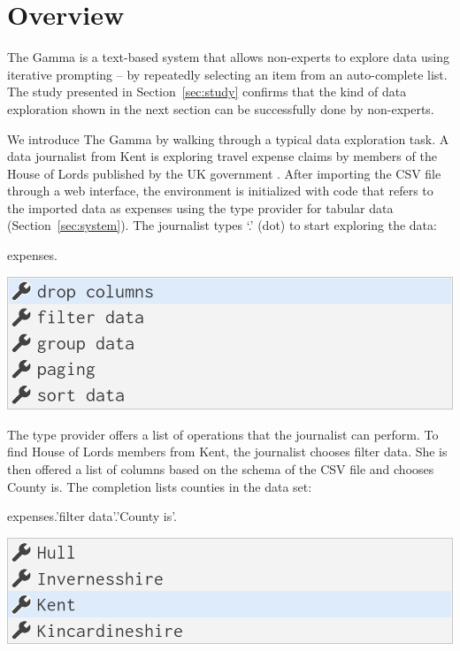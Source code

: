 \documentclass[conference]{IEEEtran}
\newcommand{\ikvd}[1]{{\fontfamily{zi4}\selectfont\small #1}}
\begin{document}

\section{Overview}
\label{sec:overview}

\noindent
The Gamma is a text-based system that allows non-experts to explore data using
iterative prompting -- by repeatedly selecting an item from an auto-complete list. The study
presented in Section~\ref{sec:study} confirms that the kind of data exploration shown in the next
section can be successfully done by non-experts.

We introduce The Gamma by walking through a
typical data exploration task. A data journalist from Kent is exploring travel expense claims
by members of the House of Lords published by the UK government \cite{lords}. After importing
the CSV file through a web interface, the environment is initialized with code that refers
to the imported data as \ikvd{expenses} using the type provider for tabular data (Section~\ref{sec:system}).
The journalist types `.' (dot) to start exploring the data:

\vspace{0.5em}
\begin{thegamma}
expenses.
\end{thegamma}
\qquad\includegraphics[width=0.7\columnwidth]{figures/lords0}
\vspace{0.5em}

\noindent
The type provider offers a list of operations that the journalist can perform. To find House of Lords
members from Kent, the journalist chooses \ikvd{filter data}. She is then offered a list of columns
based on the schema of the CSV file and chooses \ikvd{County is}. The completion lists
counties in the data set:

\vspace{0.5em}
\begin{thegamma}
expenses.'filter data'.'County is'.
\end{thegamma}
\qquad\includegraphics[width=0.7\columnwidth]{figures/lords1}
\vspace{0.5em}
\end{document}
